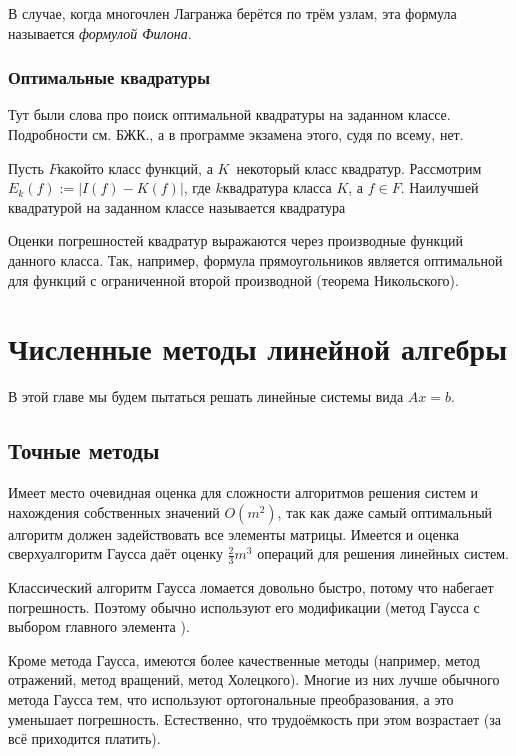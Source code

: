 \documentclass[a4paper]{article}
\DeclareMathOperator{\argmin}{argmin}
\begin{document}
\begin{df}
В случае, когда многочлен Лагранжа берётся по трём узлам, эта формула называется
\emph{формулой Филона}.
\end{df}

\subsubsection{Оптимальные квадратуры}

Тут были слова про поиск оптимальной квадратуры на заданном классе.
Подробности см. БЖК., а в программе экзамена этого, судя по всему, нет.


Пусть $F$\т какой\д то класс функций, а $K$\ некоторый класс квадратур. Рассмотрим $E_k(f) := |I(f)-K(f)|$,
где $k$\т квадратура класса $K$, а $f \in F$. Наилучшей квадратурой на заданном классе называется квадратура
\eqn{k^* := \argmin \infl{k\in K} \supl{f\in F} E_k(f).}

Оценки погрешностей квадратур выражаются через производные функций данного класса.
Так, например, формула прямоугольников является оптимальной для функций с ограниченной второй производной
(теорема Никольского).



\section{Численные методы линейной алгебры}

В этой главе мы будем пытаться решать линейные системы вида $Ax= b$.


\subsection{Точные методы}

Имеет место очевидная оценка для сложности алгоритмов решения систем и нахождения собственных значений\т
$O(m^2)$, так как даже самый оптимальный алгоритм должен задействовать  все элементы матрицы.
Имеется и оценка сверху\т алгоритм Гаусса даёт оценку $\frac23 m^3$ операций для решения линейных систем.

Классический алгоритм Гаусса ломается довольно быстро, потому что набегает погрешность.
Поэтому обычно используют его модификации (метод Гаусса с выбором главного элемента ).

Кроме метода Гаусса, имеются более качественные методы (например, метод отражений, метод вращений, метод Холецкого).
Многие из них лучше обычного метода Гаусса тем, что используют ортогональные преобразования, а это уменьшает погрешность.
Естественно, что трудоёмкость при этом возрастает (за всё приходится платить).
\end{document}
